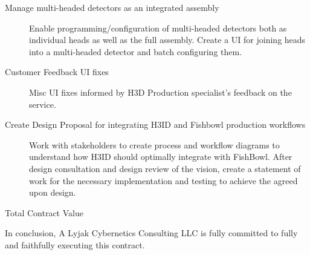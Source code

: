 \documentclass[8pt, letterpaper]{awesome-cv} %
\begin{document}
\begin{cvletter}
\begin{description}
    \item[Manage multi-headed detectors as an integrated assembly] Enable programming/configuration
      of multi-headed detectors both as individual heads as well as the full assembly. Create a UI
      for joining heads into a multi-headed detector and batch configuring
      them. 

    \item[Customer Feedback UI fixes] Misc UI fixes informed by H3D Production specialist's feedback
      on the service. 

    \item[Create Design Proposal for integrating H3ID and Fishbowl production workflows] Work with
      stakeholders to create process and workflow diagrams to understand how H3ID should optimally
      integrate with FishBowl. After design consultation and design review of the vision, create a
      statement of work for the necessary implementation and testing to achieve the agreed upon
      design. 

    \item[Total Contract Value] 

  \end{description}

  In conclusion, A Lyjak Cybernetics Consulting LLC is fully committed to fully and faithfully
  executing this contract. \\

\end{cvletter}
 \\\\\\\\\\
 \\



\end{document}
